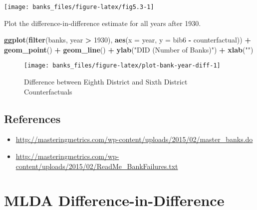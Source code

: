 \documentclass[]{book}
\newenvironment{Shaded}{\begin{snugshade}}{\end{snugshade}}
\newcommand{\KeywordTok}[1]{\textcolor[rgb]{0.13,0.29,0.53}{\textbf{#1}}}
\newcommand{\DataTypeTok}[1]{\textcolor[rgb]{0.13,0.29,0.53}{#1}}
\newcommand{\DecValTok}[1]{\textcolor[rgb]{0.00,0.00,0.81}{#1}}
\newcommand{\StringTok}[1]{\textcolor[rgb]{0.31,0.60,0.02}{#1}}
\newcommand{\OperatorTok}[1]{\textcolor[rgb]{0.81,0.36,0.00}{\textbf{#1}}}
\newcommand{\NormalTok}[1]{#1}
\providecommand{\tightlist}{%
  \setlength{\itemsep}{0pt}\setlength{\parskip}{0pt}}
\theoremstyle{definition}
\theoremstyle{definition}
\theoremstyle{definition}
\theoremstyle{remark}
\begin{document}
\begin{center}\texttt{[image: banks\_files/figure-latex/fig5.3-1]} \end{center}

Plot the difference-in-difference estimate for all years after 1930.

\begin{Shaded}
\begin{Highlighting}[]
\KeywordTok{ggplot}\NormalTok{(}\KeywordTok{filter}\NormalTok{(banks, year }\OperatorTok{>}\StringTok{ }\DecValTok{1930}\NormalTok{), }\KeywordTok{aes}\NormalTok{(}\DataTypeTok{x =}\NormalTok{ year, }\DataTypeTok{y =}\NormalTok{ bib6 }\OperatorTok{-}\StringTok{ }\NormalTok{counterfactual)) }\OperatorTok{+}
\StringTok{  }\KeywordTok{geom_point}\NormalTok{() }\OperatorTok{+}
\StringTok{  }\KeywordTok{geom_line}\NormalTok{() }\OperatorTok{+}
\StringTok{  }\KeywordTok{ylab}\NormalTok{(}\StringTok{"DID (Number of Banks)"}\NormalTok{) }\OperatorTok{+}
\StringTok{  }\KeywordTok{xlab}\NormalTok{(}\StringTok{""}\NormalTok{)}
\end{Highlighting}
\end{Shaded}

\begin{figure}

{\centering \texttt{[image: banks\_files/figure-latex/plot-bank-year-diff-1]} 

}

\caption{Difference between Eighth District and Sixth District Counterfactuals}\label{fig:plot-bank-year-diff}
\end{figure}

\section{References}\label{references-4}

\begin{itemize}
\tightlist
\item
  \url{http://masteringmetrics.com/wp-content/uploads/2015/02/master_banks.do}
\item
  \url{http://masteringmetrics.com/wp-content/uploads/2015/02/ReadMe_BankFailures.txt}
\end{itemize}

\chapter{MLDA
Difference-in-Difference}\label{mlda-difference-in-difference}
\end{document}
